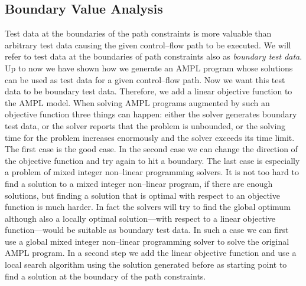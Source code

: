 \documentclass[runningheads,a4paper]{llncs}%
\begin{document}
\subsection{Boundary Value Analysis}%
\label{sec:BoundaryValueAnalysis}%
Test data at the boundaries of the path constraints is more valuable than arbitrary test data causing the given control--flow path to be executed. We will refer to test data at the boundaries of path constraints also as \emph{boundary test data}. Up to now we have shown how we generate an AMPL program whose solutions can be used as test data for a given control--flow path. Now we want this test data to be boundary test data. Therefore, we add a linear objective function to the AMPL model. When solving AMPL programs augmented by such an objective function three things can happen: either the solver generates boundary test data, or the solver reports that the problem is unbounded, or the solving time for the problem increases enormously and the solver exceeds its time limit. The first case is the good case. In the second case we can change the direction of the objective function and try again to hit a boundary. The last case is especially a problem of mixed integer non--linear programming solvers. It is not too hard to find a solution to a mixed integer non--linear program, if there are enough solutions, but finding a solution that is optimal with respect to an objective function is much harder. In fact the solvers will try to find the global optimum although also a locally optimal solution---with respect to a linear objective function---would be suitable as boundary test data. In such a case we can first use a global mixed integer non--linear programming solver to solve the original AMPL program. In a second step we add the linear objective function and use a local search algorithm using the solution generated before as starting point to find a solution at the boundary of the path constraints.
\end{document}
